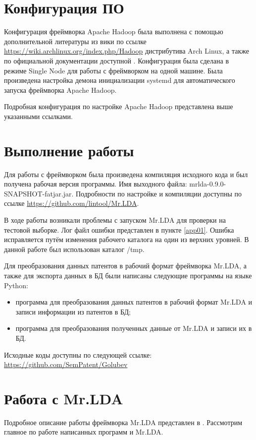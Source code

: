 \chapter{Конфигурация ПО}
Конфигурация фреймворка Apache Hadoop была выполнена с помощью дополнительной литературы из 
вики\cite{archwiki} по ссылке \url{https://wiki.archlinux.org/index.php/Hadoop} дистрибутива Arch Linux, 
а также по официальной документации доступной \cite{hadoop}. Конфигурация была сделана в режиме Single Node 
для работы с фреймворком на одной машине. Была произведена настройка демона инициализации 
systemd\cite{systemd} для автоматического запуска фреймворка Apache Hadoop. 

Подробная конфигурация по настройке Apache Hadoop представлена выше указанными ссылками.

\chapter{Выполнение работы}
Для работы с фреймворком была произведена компиляция исходного кода и был получена рабочая версия 
программы. Имя выходного файла: mrlda-0.9.0-SNAPSHOT-fatjar.jar. Подробности по настройке и компиляции 
доступны по ссылке \url{https://github.com/lintool/Mr.LDA}.

В ходе работы возникали проблемы с запуском Mr.LDA для проверки на тестовой выборке. Лог файл ошибки 
представлен в пункте \ref{app01}. Ошибка исправляется путём изменения рабочего каталога на один из 
верхних уровней. В данной работе был использован каталог /tmp.

Для преобразования данных патентов в рабочий формат фреймворка Mr.LDA, а также для экспорта данных в БД 
были написаны следующие программы на языке Python:
\begin{itemize}
    \item программа для преобразования данных патентов в рабочий формат Mr.LDA и записи информации 
        из патентов в БД;
    \item программа для преобразования полученных данные от Mr.LDA и записи их в БД.
\end{itemize}
Исходные коды доступны по следующей ссылке: \\
\url{https://github.com/SemPatent/Golubev}

\chapter{Работа с Mr.LDA}
Подробное описание работы фреймворка Mr.LDA представлен в \cite{mrlda}. Рассмотрим главное по работе 
написанных программ и Mr.LDA.

